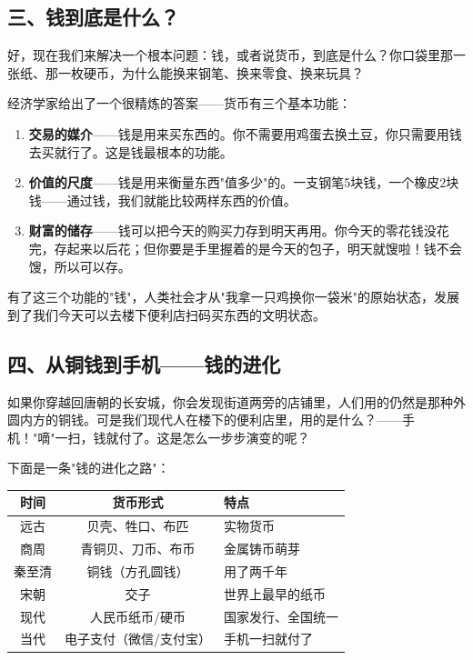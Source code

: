 \documentclass[a4paper,12pt]{ctexart}
\begin{document}
\subsection*{三、钱到底是什么？}

好，现在我们来解决一个根本问题：钱，或者说货币，到底是什么？你口袋里那一张纸、那一枚硬币，为什么能换来钢笔、换来零食、换来玩具？

经济学家给出了一个很精炼的答案——货币有三个基本功能：

\begin{enumerate}
  \item \textbf{交易的媒介}——钱是用来买东西的。你不需要用鸡蛋去换土豆，你只需要用钱去买就行了。这是钱最根本的功能。
  \item \textbf{价值的尺度}——钱是用来衡量东西"值多少"的。一支钢笔5块钱，一个橡皮2块钱——通过钱，我们就能比较两样东西的价值。
  \item \textbf{财富的储存}——钱可以把今天的购买力存到明天再用。你今天的零花钱没花完，存起来以后花；但你要是手里握着的是今天的包子，明天就馊啦！钱不会馊，所以可以存。
\end{enumerate}

\begin{center}
\end{center}

有了这三个功能的"钱"，人类社会才从"我拿一只鸡换你一袋米"的原始状态，发展到了我们今天可以去楼下便利店扫码买东西的文明状态。

\subsection*{四、从铜钱到手机——钱的进化}

如果你穿越回唐朝的长安城，你会发现街道两旁的店铺里，人们用的仍然是那种外圆内方的铜钱。可是我们现代人在楼下的便利店里，用的是什么？——手机！"嘀"一扫，钱就付了。这是怎么一步步演变的呢？

下面是一条"钱的进化之路"：

\begin{center}
\begin{tabular}{|c|c|l|}
\hline
\textbf{时间} & \textbf{货币形式} & \textbf{特点} \\
\hline
远古 & 贝壳、牲口、布匹 & 实物货币 \\
\hline
商周 & 青铜贝、刀币、布币 & 金属铸币萌芽 \\
\hline
秦至清 & 铜钱（方孔圆钱） & 用了两千年 \\
\hline
宋朝 & 交子 & 世界上最早的纸币 \\
\hline
现代 & 人民币纸币/硬币 & 国家发行、全国统一 \\
\hline
当代 & 电子支付（微信/支付宝） & 手机一扫就付了 \\
\hline
\end{tabular}
\end{center}
\end{document}

